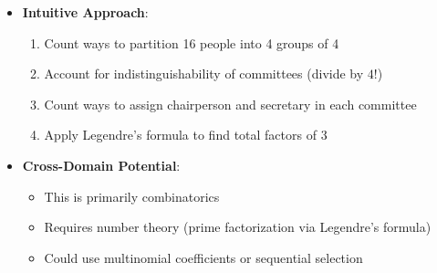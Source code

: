 \documentclass[12pt]{article}
\begin{document}
\begin{problemconfigbox}
\begin{itemize}[leftmargin=*]
    \item \textbf{Intuitive Approach}: 
    \begin{enumerate}
        \item Count ways to partition 16 people into 4 groups of 4
        \item Account for indistinguishability of committees (divide by $4!$)
        \item Count ways to assign chairperson and secretary in each committee
        \item Apply Legendre's formula to find total factors of 3
    \end{enumerate}
    
    \item \textbf{Cross-Domain Potential}: 
    \begin{itemize}
        \item This is primarily combinatorics
        \item Requires number theory (prime factorization via Legendre's formula)
        \item Could use multinomial coefficients or sequential selection
    \end{itemize}
\end{itemize}
\end{problemconfigbox}
\end{document}
